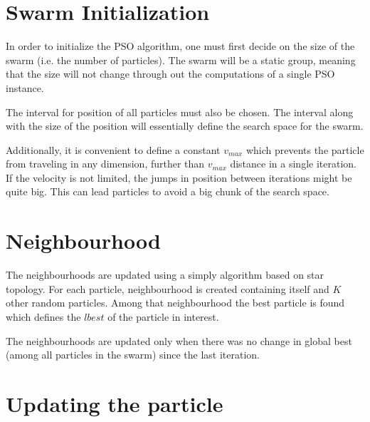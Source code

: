 \documentclass{mini}
\begin{document}


\section{Swarm Initialization}
In order to initialize the PSO algorithm, one must first decide on the size of the swarm (i.e. the number of particles). The swarm will be a static group, meaning that the size will not change through out the computations of a single PSO instance.

The interval for position of all particles must also be chosen. The interval along with the size of the position will essentially define the search space for the swarm.

Additionally, it is convenient to define a constant $v_{max}$ which prevents the particle from traveling in any dimension, further than $v_{max}$ distance in a single iteration. If the velocity is not limited, the jumps in position between iterations might be quite big. This can lead particles to avoid a big chunk of the search space.


\section{Neighbourhood}

The neighbourhoods are updated using a simply algorithm based on star topology.
For each particle, neighbourhood is created containing itself and $K$ other random particles. Among that neighbourhood the best particle is found which defines the $lbest$ of the particle in interest.

The neighbourhoods are updated only when there was no change in global best (among all particles in the swarm) since the last iteration.


\section{Updating the particle}
\end{document}
